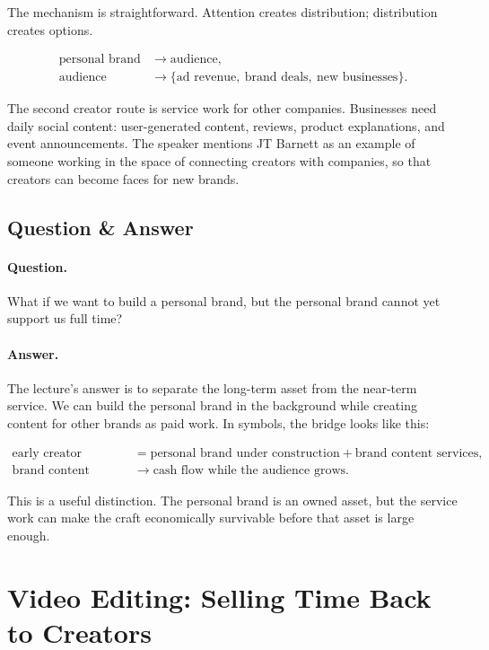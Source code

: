 The mechanism is straightforward. Attention creates distribution; distribution creates options.

\begin{align}
\text{personal brand}
&\longrightarrow
\text{audience},\\
\text{audience}
&\longrightarrow
\{\text{ad revenue},\ \text{brand deals},\ \text{new businesses}\}.
\end{align}

The second creator route is service work for other companies. Businesses need daily social content: user-generated content, reviews, product explanations, and event announcements. The speaker mentions JT Barnett as an example of someone working in the space of connecting creators with companies, so that creators can become faces for new brands.

\subsection{Question \& Answer}

\paragraph{Question.}
What if we want to build a personal brand, but the personal brand cannot yet support us full time?

\paragraph{Answer.}
The lecture's answer is to separate the long-term asset from the near-term service. We can build the personal brand in the background while creating content for other brands as paid work. In symbols, the bridge looks like this:

\begin{align}
\text{early creator}
&=
\text{personal brand under construction}
+
\text{brand content services},\\
\text{brand content services}
&\longrightarrow
\text{cash flow while the audience grows}.
\end{align}

This is a useful distinction. The personal brand is an owned asset, but the service work can make the craft economically survivable before that asset is large enough.

\section{Video Editing: Selling Time Back to Creators}


